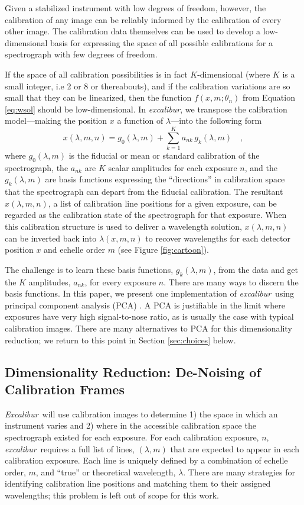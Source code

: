 \documentclass[twocolumn,table,xcolor,trackchanges]{aastex63}
\newcommand{\project}[1]{\textsl{#1}}
\newcommand{\name}{\project{excalibur}}
\newcommand{\Name}{\project{Excalibur}}
\begin{document}
Given a stabilized instrument with low degrees of freedom, however, the calibration of any image can be reliably informed by the calibration of every other image.  The calibration data themselves can be used to develop a low-dimensional basis for expressing the space of all possible calibrations for a spectrograph with few degrees of freedom.

If the space of all calibration possibilities is in fact $K$-dimensional (where $K$ is a small integer, i.e 2 or 8 or thereabouts), and if the calibration variations are so small that they can be linearized, then the function $f(x,m;\theta_{n})$ from Equation \ref{eq:wsol} should be low-dimensional.  In \name, we transpose the calibration model---making the position $x$ a function of $\lambda$---into the following form
\begin{equation}
x(\lambda,m,n) = g_0(\lambda,m) + \sum_{k=1}^K a_{nk}\,g_k(\lambda,m)
\quad ,
\label{eq:excl_wsol}
\end{equation}
where
$g_0(\lambda,m)$ is the fiducial or mean or standard calibration of the spectrograph,
the $a_{nk}$ are $K$ scalar amplitudes for each exposure $n$, and the $g_k(\lambda,m)$ are basis functions expressing the ``directions'' in calibration space that the spectrograph can depart from the fiducial calibration.  The resultant $x(\lambda,m,n)$, a list of calibration line positions for a given exposure, can be regarded as the calibration state of the spectrograph for that exposure.  When this calibration structure is used to deliver a wavelength solution, $x(\lambda,m,n)$ can be inverted back into $\lambda(x,m,n)$ to recover wavelengths for each detector position $x$ and echelle order $m$ (see Figure \ref{fig:cartoon}).

The challenge is to learn these basis functions, $g_k(\lambda,m)$, from the data and get the $K$ amplitudes, $a_{nk}$, for every exposure $n$.  There are many ways to discern the basis functions.  In this paper, we present one implementation of \name\ using principal component analysis (PCA) \citep{pearson1901, jolliffe2016}.  A PCA is justifiable in the limit where exposures have very high signal-to-nose ratio, as is usually the case with typical calibration images.  There are many alternatives to PCA for this dimensionality reduction; we return to this point in Section \ref{sec:choices} below.

\subsection{Dimensionality Reduction: De-Noising of Calibration Frames} \label{sec:denoising}
\Name\ will use calibration images to determine 1) the space in which an instrument varies and 2) where in the accessible calibration space the spectrograph existed for each exposure.  For each calibration exposure, $n$, \name\ requires a full list of lines, $(\lambda,m)$ that are expected to appear in each calibration exposure.  Each line is uniquely defined by a combination of echelle order, $m$, and ``true'' or theoretical wavelength, $\lambda$.  There are many strategies for identifying calibration line positions and matching them to their assigned wavelengths; this problem is left out of scope for this work.  
\end{document}
